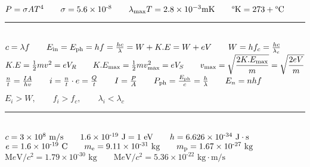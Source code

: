 \documentclass[a4paper,12pt]{article}
\newcommand{\sz}{\text{-}}
\begin{document}
\noindent
$P = \sigma AT^4 \qquad \sigma = 5.6 \times 10^{\sz8} \qquad \lambda_{\text{max}} T = 2.8 \times 10^{-3} \text{mK} \qquad \degree \text{K} = 273 + \degree \text{C}$

{\centering \rule{10cm}{0.4pt} \par}

\ \\
\noindent
$ c = \lambda f \qquad E_{\text{in}} = E_{\text{ph}} = hf = \frac{hc}{\lambda} = W + K.E = W + eV \qquad W = h f_c = \frac{hc}{\lambda_c} \\[+2mm]$
$ K.E = \frac{1}{2} mv^2 = eV_R \qquad K.E_{\text{max}} = \frac{1}{2} m v^2_{\text{max}} = eV_S \qquad v_{\text{max}} = \sqrt{\displaystyle \frac{2K.E_{\text{max}}}{m}} = \sqrt{\displaystyle \frac{2eV}{m}}\\[+2mm]$
$ \frac{n}{t} = \frac{IA}{hv} \qquad i = \frac{n}{t} \cdot e = \frac{Q}{t} \qquad I = \frac{P}{A} \qquad P_{\text{ph}} = \frac{E_\text{ph}}{c} = \frac{h}{\lambda} \qquad E_n = n hf \\$
\begin{center}
    $E_i > W, \qquad f_i > f_c, \qquad \lambda_i < \lambda_c$
\end{center}

{\centering \rule{10cm}{0.4pt} \par}

\ \\
\noindent
$c = 3 \times 10^8 \text{ m}/\text{s} \qquad 1.6\times 10^{\sz 19}\text{ J} = 1 \text{ eV} \qquad h = 6.626 \times 10^{\sz34} \text{ J} \cdot \text{s}\\[+2mm]$
$e = 1.6 \times 10^{\sz 19} \text{ C} \qquad m_{\text{e}} = 9.11 \times 10^{\sz31} \text{ kg} \qquad m_{\text{p}} = 1.67 \times 10^{\sz27} \text{ kg}\\[+2mm]$
$\text{M}e\text{V}/c^2 = 1.79 \times 10^{\sz30} \text{ kg} \qquad \text{M}e\text{V}/c^2 = 5.36 \times 10^{\sz22} \text{ kg}\cdot\text{m}/\text{s}$
\end{document}
